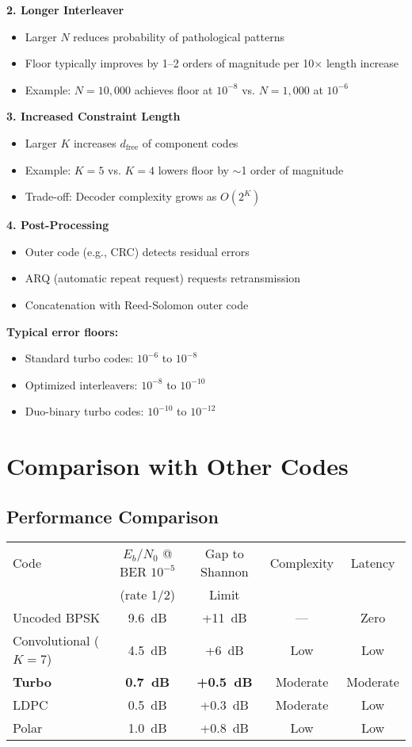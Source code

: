 \textbf{2. Longer Interleaver}
\begin{itemize}
\item Larger $N$ reduces probability of pathological patterns
\item Floor typically improves by 1--2 orders of magnitude per 10$\times$ length increase
\item Example: $N = 10{,}000$ achieves floor at $10^{-8}$ vs. $N = 1{,}000$ at $10^{-6}$
\end{itemize}

\textbf{3. Increased Constraint Length}
\begin{itemize}
\item Larger $K$ increases $d_{\text{free}}$ of component codes
\item Example: $K = 5$ vs. $K = 4$ lowers floor by $\sim$1 order of magnitude
\item Trade-off: Decoder complexity grows as $O(2^K)$
\end{itemize}

\textbf{4. Post-Processing}
\begin{itemize}
\item Outer code (e.g., CRC) detects residual errors
\item ARQ (automatic repeat request) requests retransmission
\item Concatenation with Reed-Solomon outer code
\end{itemize}

\textbf{Typical error floors:}
\begin{itemize}
\item Standard turbo codes: $10^{-6}$ to $10^{-8}$
\item Optimized interleavers: $10^{-8}$ to $10^{-10}$
\item Duo-binary turbo codes: $10^{-10}$ to $10^{-12}$
\end{itemize}

\section{Comparison with Other Codes}

\subsection{Performance Comparison}

\begin{center}
\begin{tabular}{@{}lcccc@{}}
\toprule
Code & $E_b/N_0$ @ BER $10^{-5}$ & Gap to Shannon & Complexity & Latency \\
 & (rate 1/2) & Limit & & \\
\midrule
Uncoded BPSK & 9.6~dB & +11~dB & --- & Zero \\
Convolutional ($K=7$) & 4.5~dB & +6~dB & Low & Low \\
\textbf{Turbo} & \textbf{0.7~dB} & \textbf{+0.5~dB} & Moderate & Moderate \\
LDPC & 0.5~dB & +0.3~dB & Moderate & Low \\
Polar & 1.0~dB & +0.8~dB & Low & Low \\
\bottomrule
\end{tabular}
\end{center}

